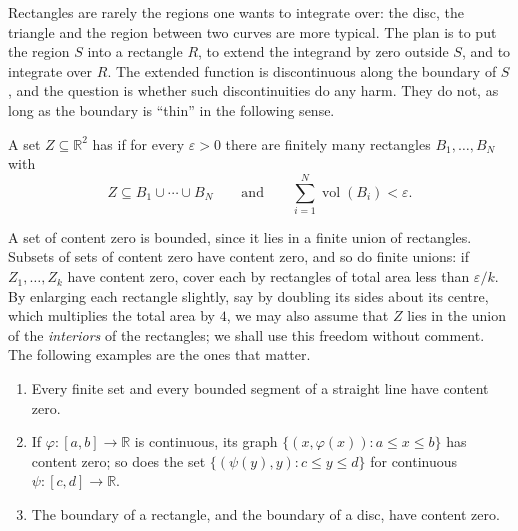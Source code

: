 Rectangles are rarely the regions one wants to integrate over: the disc, the triangle and the region between two curves are more typical. The plan is to put the region $S$ into a rectangle $R$, to extend the integrand by zero outside $S$, and to integrate over $R$. The extended function is discontinuous along the boundary of $S$, and the question is whether such discontinuities do any harm. They do not, as long as the boundary is ``thin'' in the following sense.

\begin{definition}
\label{def:content-zero}
A set $Z\subseteq\mathbb R^2$ has  if for every $\varepsilon>0$ there are finitely many rectangles $B_1,\ldots,B_N$ with
\[
Z\subseteq B_1\cup\cdots\cup B_N\qquad\text{and}\qquad\sum_{i=1}^N\operatorname{vol}(B_i)<\varepsilon .
\]
\end{definition}

A set of content zero is bounded, since it lies in a finite union of rectangles. Subsets of sets of content zero have content zero, and so do finite unions: if $Z_1,\ldots,Z_k$ have content zero, cover each by rectangles of total area less than $\varepsilon/k$. By enlarging each rectangle slightly, say by doubling its sides about its centre, which multiplies the total area by $4$, we may also assume that $Z$ lies in the union of the \emph{interiors} of the rectangles; we shall use this freedom without comment. The following examples are the ones that matter.

\begin{proposition}
\label{prop:content-zero-examples}
\leavevmode
\begin{enumerate}
\item Every finite set and every bounded segment of a straight line have content zero.
\item If $\varphi\colon[a,b]\to\mathbb R$ is continuous, its graph $\{(x,\varphi(x)): a\le x\le b\}$ has content zero; so does the set $\{(\psi(y),y): c\le y\le d\}$ for continuous $\psi\colon[c,d]\to\mathbb R$.
\item The boundary of a rectangle, and the boundary of a disc, have content zero.
\end{enumerate}
\end{proposition}

